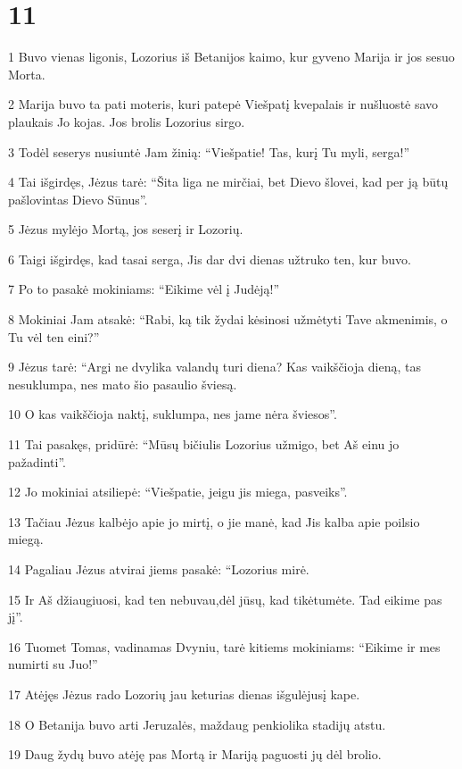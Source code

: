 \chapter{11}


\par 1 Buvo vienas ligonis, Lozorius iš Betanijos kaimo, kur gyveno Marija ir jos sesuo Morta. 
\par 2 Marija buvo ta pati moteris, kuri patepė Viešpatį kvepalais ir nušluostė savo plaukais Jo kojas. Jos brolis Lozorius sirgo. 
\par 3 Todėl seserys nusiuntė Jam žinią: “Viešpatie! Tas, kurį Tu myli, serga!” 
\par 4 Tai išgirdęs, Jėzus tarė: “Šita liga ne mirčiai, bet Dievo šlovei, kad per ją būtų pašlovintas Dievo Sūnus”. 
\par 5 Jėzus mylėjo Mortą, jos seserį ir Lozorių. 
\par 6 Taigi išgirdęs, kad tasai serga, Jis dar dvi dienas užtruko ten, kur buvo. 
\par 7 Po to pasakė mokiniams: “Eikime vėl į Judėją!” 
\par 8 Mokiniai Jam atsakė: “Rabi, ką tik žydai kėsinosi užmėtyti Tave akmenimis, o Tu vėl ten eini?” 
\par 9 Jėzus tarė: “Argi ne dvylika valandų turi diena? Kas vaikščioja dieną, tas nesuklumpa, nes mato šio pasaulio šviesą. 
\par 10 O kas vaikščioja naktį, suklumpa, nes jame nėra šviesos”. 
\par 11 Tai pasakęs, pridūrė: “Mūsų bičiulis Lozorius užmigo, bet Aš einu jo pažadinti”. 
\par 12 Jo mokiniai atsiliepė: “Viešpatie, jeigu jis miega, pasveiks”. 
\par 13 Tačiau Jėzus kalbėjo apie jo mirtį, o jie manė, kad Jis kalba apie poilsio miegą. 
\par 14 Pagaliau Jėzus atvirai jiems pasakė: “Lozorius mirė. 
\par 15 Ir Aš džiaugiuosi, kad ten nebuvau,­dėl jūsų, kad tikėtumėte. Tad eikime pas jį”. 
\par 16 Tuomet Tomas, vadinamas Dvyniu, tarė kitiems mokiniams: “Eikime ir mes numirti su Juo!” 
\par 17 Atėjęs Jėzus rado Lozorių jau keturias dienas išgulėjusį kape. 
\par 18 O Betanija buvo arti Jeruzalės, maždaug penkiolika stadijų atstu. 
\par 19 Daug žydų buvo atėję pas Mortą ir Mariją paguosti jų dėl brolio. 
